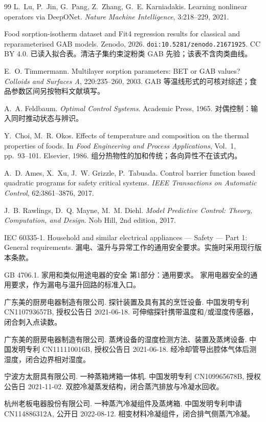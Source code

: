 \begin{thebibliography}{99}
L.~Lu, P.~Jin, G.~Pang, Z.~Zhang, G.~E. Karniadakis.
\newblock Learning nonlinear operators via DeepONet.
\newblock \emph{Nature Machine Intelligence}, 3:218--229, 2021.

Food sorption-isotherm dataset and Fit4 regression results for classical and reparameterised GAB models.
\newblock Zenodo, 2026. \texttt{doi:10.5281/zenodo.21671925}. CC BY 4.0.
\newblock 已读入拟合表。清洁子集约束淀粉类 GAB 先验；该表不含肉类曲线。

E.~O. Timmermann.
\newblock Multilayer sorption parameters: BET or GAB values?
\newblock \emph{Colloids and Surfaces A}, 220:235--260, 2003.
\newblock GAB 等温线形式的可核对综述；食品参数区间另按物料文献填写。

A.~A. Feldbaum.
\newblock \emph{Optimal Control Systems}.
\newblock Academic Press, 1965.
\newblock 对偶控制：输入同时推动状态与辨识。

Y.~Choi, M.~R. Okos.
\newblock Effects of temperature and composition on the thermal properties of foods.
\newblock In \emph{Food Engineering and Process Applications}, Vol.~1, pp.~93--101. Elsevier, 1986.
\newblock 组分热物性的加和传统；各向异性不在该式内。

A.~D. Ames, X.~Xu, J.~W. Grizzle, P.~Tabuada.
\newblock Control barrier function based quadratic programs for safety critical systems.
\newblock \emph{IEEE Transactions on Automatic Control}, 62:3861--3876, 2017.

J.~B. Rawlings, D.~Q. Mayne, M.~M. Diehl.
\newblock \emph{Model Predictive Control: Theory, Computation, and Design}.
\newblock Nob Hill, 2nd edition, 2017.

IEC 60335-1.
\newblock Household and similar electrical appliances --- Safety --- Part 1: General requirements.
\newblock 漏电、温升与异常工作的通用安全要求。实施时采用现行版本条款。

GB 4706.1.
\newblock 家用和类似用途电器的安全 第1部分：通用要求。
\newblock 家用电器安全的通用要求，作为漏电与温升回路的标准入口。

广东美的厨房电器制造有限公司.
\newblock 探针装置及具有其的烹饪设备.
\newblock 中国发明专利 CN110793657B, 授权公告日 2021-06-18.
\newblock 可伸缩探针携带温度和/或湿度传感器，闭合刺入点读数。

广东美的厨房电器制造有限公司.
\newblock 蒸烤设备的湿度检测方法、装置及蒸烤设备.
\newblock 中国发明专利 CN111110016B, 授权公告日 2021-06-18.
\newblock 经冷却管导出腔体气体后测湿度，闭合边界相对湿度。

宁波方太厨具有限公司.
\newblock 一种蒸箱烤箱一体机.
\newblock 中国发明专利 CN109965678B, 授权公告日 2021-11-02.
\newblock 双腔冷凝蒸发结构，闭合蒸汽排放与冷凝水回收。

杭州老板电器股份有限公司.
\newblock 一种蒸汽冷凝组件及蒸烤箱.
\newblock 中国发明专利申请 CN114886312A, 公开日 2022-08-12.
\newblock 相变材料冷凝组件，闭合排气侧蒸汽冷凝。
\end{thebibliography}
